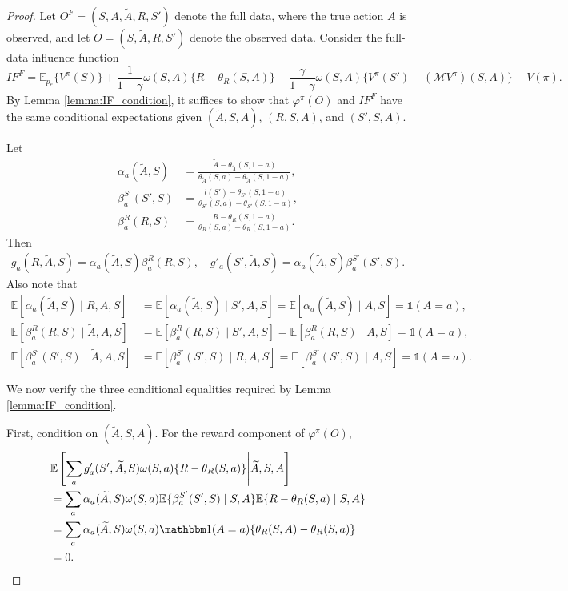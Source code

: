 \documentclass[12pt]{article}
\newcommand{\0}{\boldsymbol{0}}
\newcommand{\E}{\mathbb{E}}
\begin{document}
\begin{proof}
Let \(O^F=(S,A,\widetilde A,R,S')\) denote the full data, where the true action \(A\) is observed, and let \(O=(S,\widetilde A,R,S')\) denote the observed data. 
Consider the full-data influence function
\[
IF^F=\mathbb E_{p_e}\{V^\pi(S)\} + \frac{1}{1-\gamma}\omega(S,A)\{R-\theta_R(S,A)\}
+\frac{\gamma}{1-\gamma}\omega(S,A)\{V^\pi(S')-(\mathcal M V^\pi)(S,A)\}-V(\pi).
\]
By Lemma \ref{lemma:IF_condition}, it suffices to show that \(\varphi^\pi(O)\) and \(IF^F\) have the same conditional expectations given \((\widetilde A,S,A)\), \((R,S,A)\), and \((S',S,A)\).

Let
\begin{align*}
\alpha_a(\widetilde A,S) &= \frac{\widetilde A-\theta_{\widetilde A}(S,1-a)}{\theta_{\widetilde A}(S,a)-\theta_{\widetilde A}(S,1-a)}, \\
\beta_a^{S'}(S',S) &= \frac{l(S')-\theta_{S'}(S,1-a)}{\theta_{S'}(S,a)-\theta_{S'}(S,1-a)},\\
\beta_a^R(R, S) &= \frac{R-\theta_{R}(S,1-a)}{\theta_{R}(S,a)-\theta_{R}(S,1-a)}.
\end{align*}
Then
\begin{align*}
g_a(R,\widetilde A,S) = \alpha_a(\widetilde A,S)\beta_a^R(R, S),\quad
g'_a(S',\widetilde A,S) = \alpha_a(\widetilde A,S) \beta_a^{S'}(S',S).
\end{align*}
Also note that
\begin{align*}
\E[\alpha_a(\widetilde A,S)\mid R,A,S] &= \E[\alpha_a(\widetilde A,S)\mid S',A,S] = \E[\alpha_a(\widetilde A,S)\mid A,S] = \mathds{1}(A=a), \\
\E[\beta^R_a(R,S)\mid \widetilde A,A,S] &= \E[\beta^R_a(R,S)\mid S',A,S] = \E[\beta^R_a(R,S)\mid A,S] = \mathds{1}(A=a),\\
\E[\beta^{S'}_a(S',S)\mid \widetilde A,A,S] &= \E[\beta^{S'}_a(S',S)\mid R,A,S] = \E[\beta^{S'}_a(S',S)\mid A,S] = \mathds{1}(A=a).
\end{align*}


We now verify the three conditional equalities required by Lemma \ref{lemma:IF_condition}.

First, condition on $(\widetilde A,S,A)$. For the reward component of
$\varphi^\pi(O)$,
\[
\begin{aligned}
&\mathbb E\left[\sum_a
g_a'(S',\widetilde A,S)\omega(S,a)\{R-\theta_R(S,a)\}\middle|\widetilde A,S,A\right] \\
&=\sum_a\alpha_a(\widetilde A,S)\omega(S,a)\mathbb E\{\beta_a^{S'}(S',S)\mid S,A\}\mathbb E\{R-\theta_R(S,a)\mid S,A\} \\
&=\sum_a\alpha_a(\widetilde A,S)\omega(S,a)\mathbbm 1(A=a)\{\theta_R(S,A)-\theta_R(S,a)\} \\
&=0.
\end{aligned}
\]


\end{proof}
\end{document}
